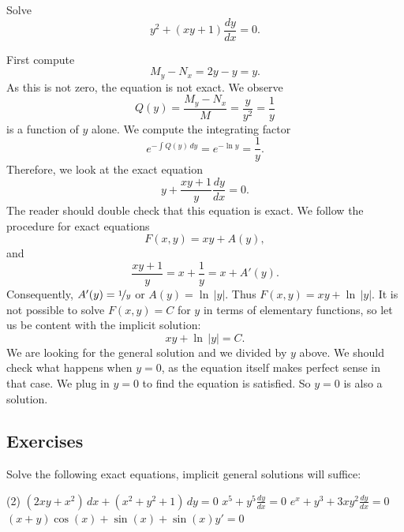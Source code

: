 \begin{example}
Solve
\begin{equation*}
y^2 + (xy+1) \frac{dy}{dx} = 0 .
\end{equation*}

First compute
\begin{equation*}
M_y-N_x = 2y-y = y .
\end{equation*}
As this is not zero, the equation is not exact.  We observe
\begin{equation*}
Q(y) = \frac{M_y-N_x}{M} = \frac{y}{y^2} = \frac{1}{y} 
\end{equation*}
is a function of $y$ alone.    We compute the integrating factor
\begin{equation*}
e^{-\int  Q(y) \, dy}
=
e^{-\ln y} = \frac{1}{y} .
\end{equation*}
Therefore, we look at the exact equation
\begin{equation*}
y + \frac{xy+1}{y} \frac{dy}{dx} = 0 .
\end{equation*}
The reader should double check that this equation is exact.
We follow the procedure for exact equations
\begin{equation*}
F(x,y) = xy + A(y) ,
\end{equation*}
and
\begin{equation}
\frac{xy+1}{y} = x+\frac{1}{y} = x+ A'(y) .
\end{equation}
Consequently, $A'(y) = \nicefrac{1}{y}$ or $A(y) = \ln \, \lvert y \rvert$.  Thus $F(x,y)
= xy + \ln \, \lvert y \rvert$.
It is not possible to solve $F(x,y)=C$ for $y$
in terms of elementary functions, so 
let us be content with the implicit solution:
\begin{equation*}
xy + \ln \, \lvert y \rvert = C .
\end{equation*}
We are looking for the general solution and we divided by
$y$ above.  We should check what happens when $y=0$, as the equation itself
makes perfect sense in that case.  We plug in $y=0$ to find the
equation is satisfied.  So $y=0$ is also a solution.
\end{example}

\subsection{Exercises}

\begin{exercise}
Solve the following exact equations, implicit general solutions
will suffice:
\begin{tasks}(2)
\task
$(2 xy + x^2) \, dx + (x^2+y^2+1) \, dy = 0$
\task
$x^5 + y^5 \frac{dy}{dx} = 0$
\task
$e^x+y^3 + 3xy^2 \frac{dy}{dx} = 0$
\task
$(x+y)\cos(x)+\sin(x) + \sin(x)y' = 0$
\end{tasks}
\end{exercise}

